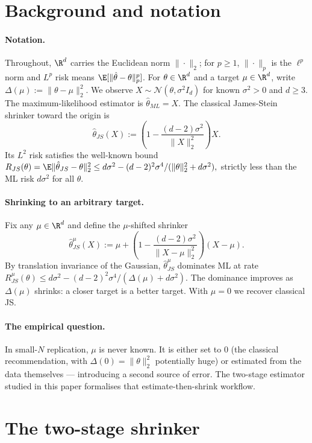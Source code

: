 \documentclass{rrxiv}
\begin{document}
\section{Background and notation}
\label{sec:background}

\paragraph{Notation.} Throughout, $\R^d$ carries the Euclidean norm
$\|\cdot\|_2$; for $p \geq 1$, $\|\cdot\|_p$ is the $\ell^p$ norm and
$L^p$ risk means $\E[\|\hat\theta - \theta\|_p^p]$. For
$\theta \in \R^d$ and a target $\mu \in \R^d$, write
$\Delta(\mu) := \|\theta - \mu\|_2^2$. We observe
$X \sim \mathcal{N}(\theta, \sigma^2 I_d)$ for known $\sigma^2 > 0$ and
$d \geq 3$. The maximum-likelihood estimator is $\hat\theta_{ML} = X$. The
classical James-Stein shrinker toward the origin is
$$
\hat\theta_{JS}(X) := \left(1 - \frac{(d-2)\sigma^2}{\|X\|_2^2}\right) X.
$$
Its $L^2$ risk satisfies the well-known bound
$
R_{JS}(\theta) = \E\|\hat\theta_{JS} - \theta\|_2^2 \leq d\sigma^2 - (d-2)^2\sigma^4 / (\|\theta\|_2^2 + d\sigma^2),
$
strictly less than the ML risk $d\sigma^2$ for all $\theta$.

\paragraph{Shrinking to an arbitrary target.} Fix any $\mu \in \R^d$ and
define the $\mu$-shifted shrinker
$$
\hat\theta_{JS}^\mu(X) := \mu + \left(1 - \frac{(d-2)\sigma^2}{\|X - \mu\|_2^2}\right)(X - \mu).
$$
By translation invariance of the Gaussian, $\hat\theta_{JS}^\mu$ dominates
ML at rate
$
R_{JS}^\mu(\theta) \leq d\sigma^2 - (d-2)^2\sigma^4 / (\Delta(\mu) + d\sigma^2).
$
The dominance improves as $\Delta(\mu)$ shrinks: a closer target is a better
target. With $\mu = 0$ we recover classical JS.

\paragraph{The empirical question.} In small-$N$ replication, $\mu$ is never
known. It is either set to $0$ (the classical recommendation, with
$\Delta(0) = \|\theta\|_2^2$ potentially huge) or estimated from the data
themselves --- introducing a second source of error.
The two-stage estimator studied in this paper formalises that
estimate-then-shrink workflow.

\section{The two-stage shrinker}
\label{sec:approach}
\end{document}
